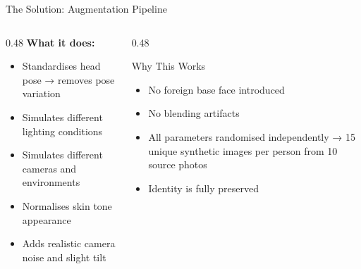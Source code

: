 \documentclass[aspectratio=169]{beamer}
\begin{document}
\begin{frame}{The Solution: Augmentation Pipeline}
\vspace{8pt}
\begin{columns}[T]
\begin{column}{0.48\textwidth}
    \textbf{What it does:}
    \begin{itemize}
        \item Standardises head pose → removes pose variation
        \item Simulates different lighting conditions
        \item Simulates different cameras and environments
        \item Normalises skin tone appearance
        \item Adds realistic camera noise and slight tilt
    \end{itemize}
\end{column}
\begin{column}{0.48\textwidth}
    \begin{exampleblock}{Why This Works}
        \begin{itemize}
            \item No foreign base face introduced
            \item No blending artifacts
            \item All parameters randomised independently → 15 unique synthetic images per person from 10 source photos
            \item Identity is fully preserved
        \end{itemize}
    \end{exampleblock}
\end{column}
\end{columns}
\end{frame}
\end{document}
